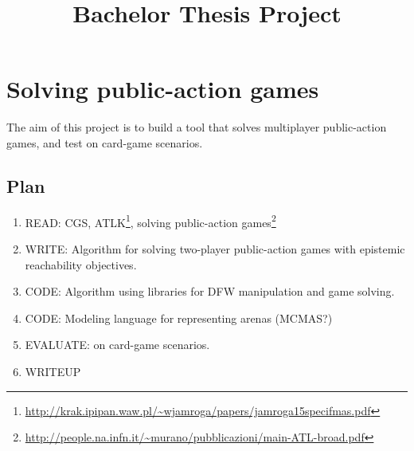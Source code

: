 \documentclass[a4paper,10pt]{article}
\title{Bachelor Thesis Project}
\author{}
\date{}
\begin{document}
\maketitle

\section*{Solving public-action games}



The aim of this project is to build a tool that solves multiplayer public-action games,
and test on card-game scenarios.


\subsection*{Plan}
\begin{enumerate}
\item READ: CGS, ATLK\footnote{\url{http://krak.ipipan.waw.pl/~wjamroga/papers/jamroga15specifmas.pdf}}, solving public-action games\footnote{\url{http://people.na.infn.it/~murano/pubblicazioni/main-ATL-broad.pdf}}
\item WRITE: Algorithm for solving two-player public-action games with epistemic reachability objectives.
\item CODE: Algorithm using libraries for DFW manipulation and game solving.
\item CODE: Modeling language for representing arenas (MCMAS?) 
\item EVALUATE: on card-game scenarios.
\item WRITEUP
\end{enumerate}


% 
% 
\end{document}

